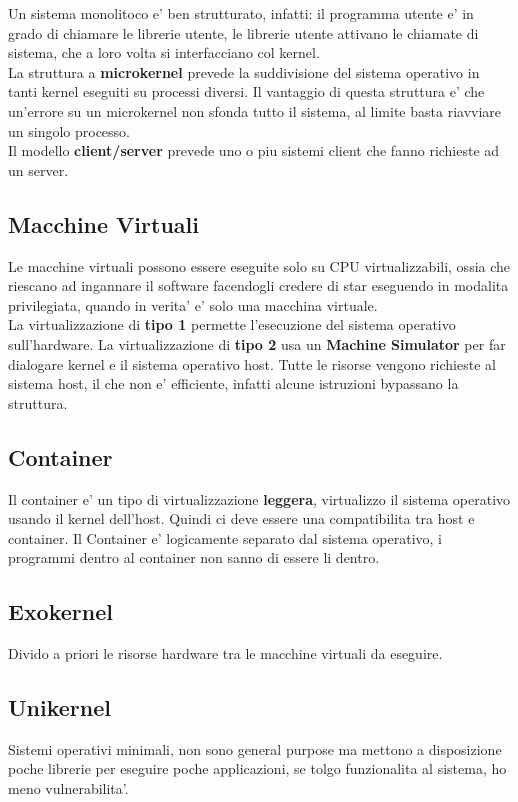 Un sistema monolitoco e' ben strutturato, infatti: il programma utente 
e' in grado di chiamare le librerie utente, le librerie utente attivano le chiamate di sistema, 
che a loro volta si interfacciano col kernel. \\

La struttura a \textbf{microkernel} prevede la suddivisione del sistema operativo 
in tanti kernel eseguiti su processi diversi. Il vantaggio di questa struttura e' che un'errore
su un microkernel non sfonda tutto il sistema, al limite basta riavviare un singolo processo. \\

Il modello \textbf{client/server } prevede uno o piu sistemi client che fanno richieste ad un server. \\

\subsection{Macchine Virtuali}
Le macchine virtuali possono essere eseguite solo su CPU virtualizzabili, ossia che 
riescano ad ingannare il software facendogli credere di star eseguendo in modalita privilegiata,
quando in verita' e' solo una macchina virtuale. \\

La virtualizzazione di \textbf{tipo 1} permette l'esecuzione del sistema operativo sull'hardware.
La virtualizzazione di \textbf{tipo 2} usa un \textbf{Machine Simulator} per far dialogare
kernel e il sistema operativo host. Tutte le risorse vengono richieste al sistema host, il che non e' efficiente,
infatti alcune istruzioni bypassano la struttura.

\subsection{Container}
Il container e' un tipo di virtualizzazione \textbf{leggera}, virtualizzo il sistema operativo usando il kernel 
dell'host. Quindi ci deve essere una compatibilita tra host e container.
Il Container e' logicamente separato dal sistema operativo, i programmi dentro al container non sanno di essere li dentro.

\subsection{Exokernel}
Divido a priori le risorse hardware tra le macchine virtuali da eseguire.

\subsection{Unikernel}
Sistemi operativi minimali, non sono general purpose ma 
mettono a disposizione poche librerie per eseguire poche applicazioni,
se tolgo funzionalita al sistema, ho meno vulnerabilita'.